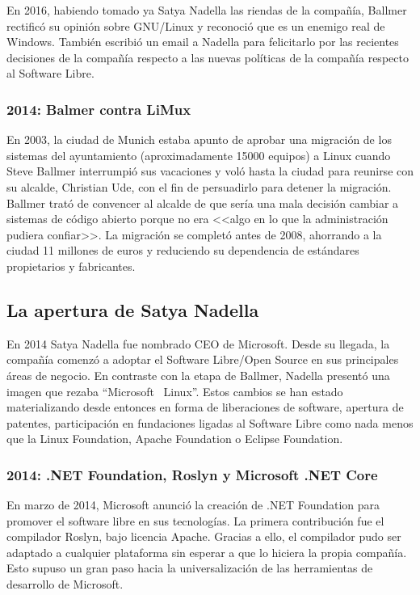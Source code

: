 En 2016, habiendo tomado ya Satya Nadella las riendas de la compañía, Ballmer rectificó su opinión sobre GNU/Linux y reconoció que es un enemigo real de Windows. También escribió un email a Nadella para felicitarlo por las recientes decisiones de la compañía respecto a las nuevas políticas de la compañía respecto al Software Libre.\cite{tung_2016:ballmer_linux_no_more_cancer}

\subsubsection{2014: Balmer contra LiMux}
En 2003, la ciudad de Munich estaba apunto de aprobar una migración de los sistemas del ayuntamiento (aproximadamente 15000 equipos) a Linux cuando Steve Ballmer interrumpió sus vacaciones y voló hasta la ciudad para reunirse con su alcalde, Christian Ude, con el fin de persuadirlo para detener la migración. Ballmer trató de convencer al alcalde de que sería una mala decisión cambiar a sistemas de código abierto porque no era <<algo en lo que la administración pudiera confiar>>. La migración se completó antes de 2008, ahorrando a la ciudad 11 millones de euros y reduciendo su dependencia de estándares propietarios y fabricantes.\cite{munich_linux_migration}

\subsection{La apertura de Satya Nadella}
En 2014 Satya Nadella fue nombrado CEO de Microsoft. Desde su llegada, la compañía comenzó a adoptar el Software Libre/Open Source en sus principales áreas de negocio. En contraste con la etapa de Ballmer, Nadella presentó una imagen que rezaba ``Microsoft \heart\ Linux''. Estos cambios se han estado materializando desde entonces en forma de liberaciones de software, apertura de patentes, participación en fundaciones ligadas al Software Libre como nada menos que la Linux Foundation, Apache Foundation o Eclipse Foundation.

\subsubsection{2014: .NET Foundation, Roslyn y Microsoft .NET Core}
En marzo de 2014, Microsoft anunció la creación de .NET Foundation para promover el software libre en sus tecnologías. La primera contribución fue el compilador Roslyn, bajo licencia Apache. Gracias a ello, el compilador pudo ser adaptado a cualquier plataforma sin esperar a que lo hiciera la propia compañía. Esto supuso un gran paso hacia la universalización de las herramientas de desarrollo de Microsoft.\cite{xatakaw_2014:net_foundation}

